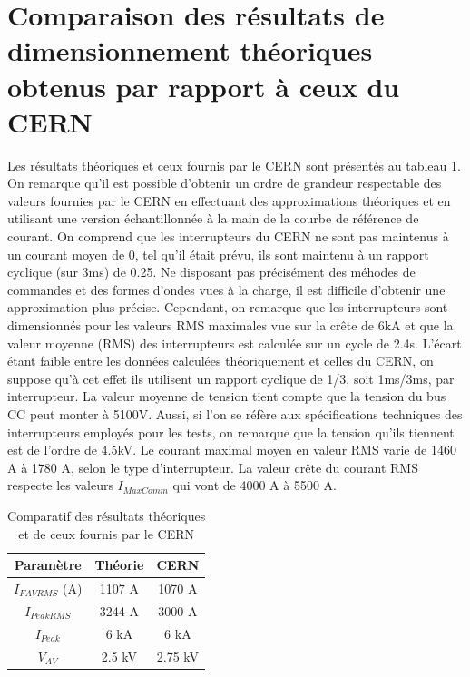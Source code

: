 \section{Comparaison des résultats de dimensionnement théoriques obtenus par rapport à ceux du CERN}
Les résultats théoriques et ceux fournis par le CERN sont présentés au tableau \ref{tab_comp_1}. On remarque qu'il est possible d'obtenir un ordre de grandeur respectable des valeurs fournies par le CERN en effectuant des approximations théoriques et en utilisant une version échantillonnée à la main de la courbe de référence de courant. On comprend que les interrupteurs du CERN ne sont pas maintenus à un courant moyen de 0, tel qu'il était prévu, ils sont maintenu à un rapport cyclique (sur 3ms) de 0.25. Ne disposant pas précisément des méhodes de commandes et des formes d'ondes vues à la charge, il est difficile d'obtenir une approximation plus précise. Cependant, on remarque que les interrupteurs sont dimensionnés pour les valeurs RMS maximales vue sur la crête de 6kA et que la valeur moyenne (RMS) des interrupteurs est calculée sur un cycle de 2.4s. L'écart étant faible entre les données calculées théoriquement et celles du CERN, on suppose qu'à cet effet ils utilisent un rapport cyclique de 1/3, soit 1ms/3ms, par interrupteur. La valeur moyenne de tension tient compte que la tension du bus CC peut monter à 5100V. Aussi, si l'on se réfère aux spécifications techniques des interrupteurs employés pour les tests, on remarque que la tension qu'ils tiennent est de l'ordre de 4.5kV. Le courant maximal moyen en valeur RMS varie de 1460 A à 1780 A, selon le type d'interrupteur. La valeur crête du courant RMS respecte les valeurs $I_{MaxComm}$ qui vont de 4000 A à 5500 A.

\begin{table}[htb]
\centering
\begin{tabular}{ |c|c|c| }
\hline
  Paramètre & Théorie & CERN\\\hline\hline
  $I_{FAVRMS}$ (A) & 1107 A & 1070 A \\\hline
  $I_{PeakRMS}$ & 3244 A & 3000 A \\\hline
  $I_{Peak}$ & 6 kA & 6 kA \\\hline
  $V_{AV}$ & 2.5 kV & 2.75 kV \\\hline
\end{tabular}
\caption{Comparatif des résultats théoriques et de ceux fournis par le CERN}
\label{tab_comp_1}
\end{table}
